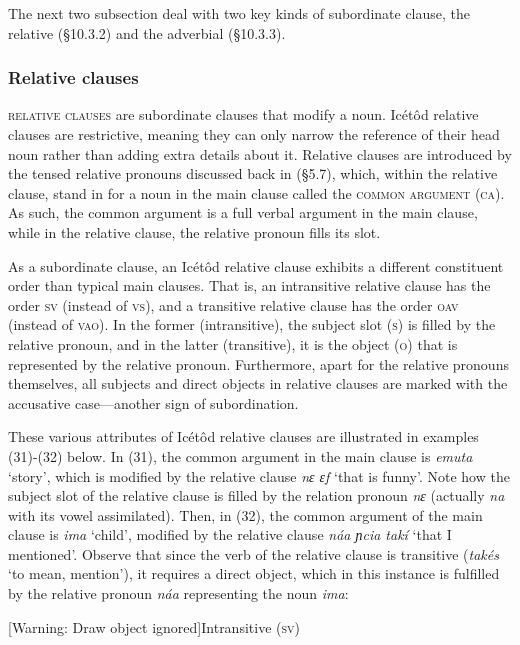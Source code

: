 The next two subsection deal with two key kinds of subordinate clause, the relative (§10.3.2) and the adverbial (§10.3.3).


\subsubsection{Relative clauses}

\textsc{relative clauses} are subordinate clauses that modify a noun. Icétôd relative clauses are restrictive, meaning they can only narrow the reference of their head noun rather than adding extra details about it. Relative clauses are introduced by the tensed relative pronouns discussed back in (§5.7), which, within the relative clause, stand in for a noun in the main clause called the \textsc{common argument} (\textsc{ca}). As such, the common argument is a full verbal argument in the main clause, while in the relative clause, the relative pronoun fills its slot.

As a subordinate clause, an Icétôd relative clause exhibits a different constituent order than typical main clauses. That is, an intransitive relative clause has the order \textsc{sv} (instead of \textsc{vs}), and a transitive relative clause has the order \textsc{oav} (instead of \textsc{vao}). In the former (intransitive), the subject slot (\textsc{s}) is filled by the relative pronoun, and in the latter (transitive), it is the object (\textsc{o}) that is represented by the relative pronoun. Furthermore, apart for the relative pronouns themselves, all subjects and direct objects in relative clauses are marked with the accusative case—another sign of subordination.

These various attributes of Icétôd relative clauses are illustrated in examples (31)-(32) below. In (31), the common argument in the main clause is \textit{emuta} ‘story’, which is modified by the relative clause \textit{nɛ ɛf} ‘that is funny’. Note how the subject slot of the relative clause is filled by the relation pronoun \textit{nɛ} (actually \textit{na} with its vowel assimilated). Then, in (32), the common argument of the main clause is \textit{ima} ‘child’, modified by the relative clause \textit{náa ɲcia takí} ‘that I mentioned’. Observe that since the verb of the relative clause is transitive (\textit{takés} ‘to mean, mention’), it requires a direct object, which in this instance is fulfilled by the relative pronoun \textit{náa} representing the noun \textit{ima}:




[Warning: Draw object ignored]Intransitive (\textsc{sv})

